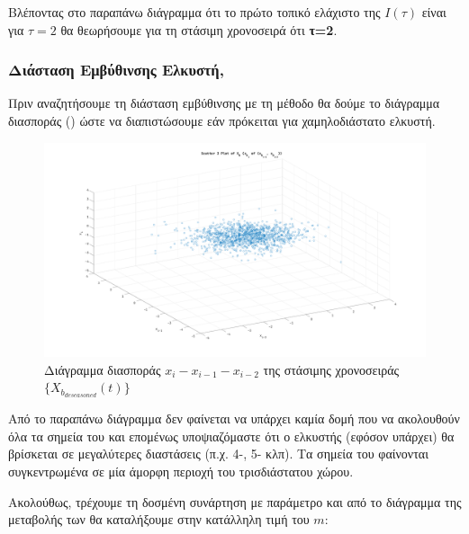 Βλέποντας στο παραπάνω διάγραμμα ότι το πρώτο τοπικό ελάχιστο της $I(\tau)$ είναι για $\tau=2$ θα θεωρήσουμε για τη στάσιμη χρονοσειρά  ότι \textbf{τ=2}.

\subsubsection{Διάσταση Εμβύθινσης Ελκυστή, }

Πριν αναζητήσουμε τη διάσταση εμβύθινσης με τη μέθοδο  θα δούμε το διάγραμμα διασποράς () ώστε να διαπιστώσουμε εάν πρόκειται για χαμηλοδιάστατο ελκυστή. 

\begin{figure}[H]
    \begin{center}
        \includegraphics[width=\textwidth]{assets/images/plots/scatter3_b.svg.pdf}
        \caption{Διάγραμμα διασποράς $x_i-x_{i-1}-x_{i-2}$ της στάσιμης χρονοσειράς $\{X_{b_{deseasoned}}(t)\}$}
        \label{fig:scatter3_b}
    \end{center}
\end{figure}

Από το παραπάνω διάγραμμα δεν φαίνεται να υπάρχει καμία δομή που να ακολουθούν όλα τα σημεία του  και επομένως υποψιαζόμαστε ότι ο ελκυστής (εφόσον υπάρχει) θα βρίσκεται σε μεγαλύτερες διαστάσεις (π.χ. 4-, 5- κλπ). Τα σημεία του  φαίνονται συγκεντρωμένα σε μία άμορφη περιοχή του τρισδιάστατου χώρου.

\par Ακολούθως, τρέχουμε τη δοσμένη συνάρτηση \texttt{} με παράμετρο \texttt{} και από το διάγραμμα της μεταβολής των  θα καταλήξουμε στην κατάλληλη τιμή του $m$:

